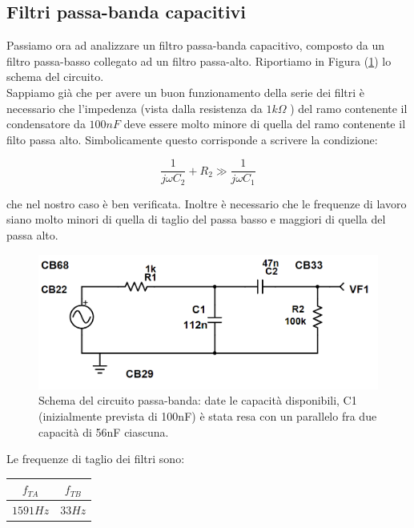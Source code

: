 \documentclass[journal, a4paper]{IEEEtran}
\begin{document}
\subsection{Filtri passa-banda capacitivi}
Passiamo ora ad analizzare un filtro passa-banda capacitivo, composto da un filtro passa-basso collegato ad un filtro passa-alto. Riportiamo in Figura (\ref{fig:breadboard2_passabanda}) lo schema del circuito. \\

Sappiamo già che per avere un buon funzionamento della serie dei filtri è necessario che l'impedenza (vista dalla resistenza da $ 1 k\Omega $ ) del ramo contenente il condensatore da $ 100 nF $ deve essere molto minore di quella del ramo contenente il filto passa alto. Simbolicamente questo corrisponde a scrivere la condizione:

\begin{equation}
\frac{1}{j\omega C_2} + R_2 \gg \frac{1}{j\omega C_1}
\end{equation}

che nel nostro caso è ben verificata. Inoltre è necessario che le frequenze di lavoro siano molto minori di quella di taglio del passa basso e maggiori di quella del passa alto.

\begin{figure}
\centering
\includegraphics[width=0.7\linewidth]{./breadboard2_passabanda}
\caption{Schema del circuito passa-banda: date le capacità disponibili, C1 (inizialmente prevista di 100nF) è stata resa con un parallelo fra due capacità di 56nF ciascuna.}
\label{fig:breadboard2_passabanda}
\end{figure}


Le frequenze di taglio dei filtri sono:\\

\begin{tabular}{|c|c|}
\hline $f_{TA}$ & $f_{TB} $\\ 
\hline $1591 \si{Hz}$ & $33 \si{Hz}$ \\ 
\hline 
\end{tabular} \\
\end{document}
